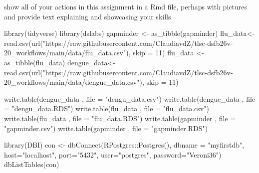 \documentclass[
]{book}
\newenvironment{Shaded}{\begin{snugshade}}{\end{snugshade}}
\newcommand{\AttributeTok}[1]{\textcolor[rgb]{0.77,0.63,0.00}{#1}}
\newcommand{\DecValTok}[1]{\textcolor[rgb]{0.00,0.00,0.81}{#1}}
\newcommand{\FunctionTok}[1]{\textcolor[rgb]{0.00,0.00,0.00}{#1}}
\newcommand{\NormalTok}[1]{#1}
\newcommand{\OtherTok}[1]{\textcolor[rgb]{0.56,0.35,0.01}{#1}}
\newcommand{\SpecialCharTok}[1]{\textcolor[rgb]{0.00,0.00,0.00}{#1}}
\newcommand{\StringTok}[1]{\textcolor[rgb]{0.31,0.60,0.02}{#1}}
\begin{document}
show all of your actions in this assignment in a Rmd file, perhaps with pictures and provide text explaining and showcasing your skills.

\begin{Shaded}
\begin{Highlighting}[]
\FunctionTok{library}\NormalTok{(tidyverse)}
\FunctionTok{library}\NormalTok{(dslabs)}
\NormalTok{gapminder }\OtherTok{\textless{}{-}} \FunctionTok{as\_tibble}\NormalTok{(gapminder)}
\NormalTok{flu\_data}\OtherTok{\textless{}{-}} \FunctionTok{read.csv}\NormalTok{(}\FunctionTok{url}\NormalTok{(}\StringTok{"https://raw.githubusercontent.com/ClaudiavdZ/tlsc{-}dsfb26v{-}20\_workflows/main/data/flu\_data.csv"}\NormalTok{), }\AttributeTok{skip =} \DecValTok{11}\NormalTok{)}
\NormalTok{flu\_data }\OtherTok{\textless{}{-}} \FunctionTok{as\_tibble}\NormalTok{(flu\_data)}
\NormalTok{dengue\_data}\OtherTok{\textless{}{-}} \FunctionTok{read.csv}\NormalTok{(}\FunctionTok{url}\NormalTok{(}\StringTok{"https://raw.githubusercontent.com/ClaudiavdZ/tlsc{-}dsfb26v{-}20\_workflows/main/data/dengue\_data.csv"}\NormalTok{), }\AttributeTok{skip =} \DecValTok{11}\NormalTok{)}

\FunctionTok{write.table}\NormalTok{(dengue\_data , }\AttributeTok{file =} \StringTok{"dengu\_data.csv"}\NormalTok{)}
\FunctionTok{write.table}\NormalTok{(dengue\_data , }\AttributeTok{file =} \StringTok{"dengu\_data.RDS"}\NormalTok{)}
\FunctionTok{write.table}\NormalTok{(flu\_data , }\AttributeTok{file =} \StringTok{"flu\_data.csv"}\NormalTok{)}
\FunctionTok{write.table}\NormalTok{(flu\_data , }\AttributeTok{file =} \StringTok{"flu\_data.RDS"}\NormalTok{)}
\FunctionTok{write.table}\NormalTok{(gapminder , }\AttributeTok{file =} \StringTok{"gapminder.csv"}\NormalTok{)}
\FunctionTok{write.table}\NormalTok{(gapminder , }\AttributeTok{file =} \StringTok{"gapminder.RDS"}\NormalTok{)}

\FunctionTok{library}\NormalTok{(DBI)}
\NormalTok{con }\OtherTok{\textless{}{-}} \FunctionTok{dbConnect}\NormalTok{(RPostgres}\SpecialCharTok{::}\FunctionTok{Postgres}\NormalTok{(), }
                 \AttributeTok{dbname =} \StringTok{"myfirstdb"}\NormalTok{, }
                 \AttributeTok{host=}\StringTok{"localhost"}\NormalTok{, }
                 \AttributeTok{port=}\StringTok{"5432"}\NormalTok{, }
                 \AttributeTok{user=}\StringTok{"postgres"}\NormalTok{, }
                 \AttributeTok{password=}\StringTok{"Veroni36"}\NormalTok{) }
\FunctionTok{dbListTables}\NormalTok{(con) }
\end{Highlighting}
\end{Shaded}
\end{document}
